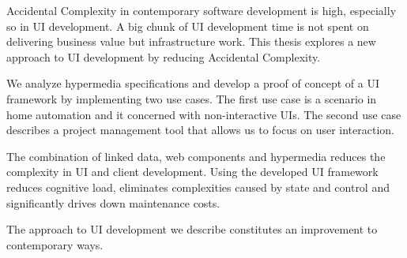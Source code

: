 Accidental Complexity in contemporary software development is high, especially so in UI development. A big chunk of UI development time is not spent on delivering business value but infrastructure work. This thesis explores a new approach to UI development by reducing Accidental Complexity.

We analyze hypermedia specifications and develop a proof of concept of a UI framework by implementing two use cases. The first use case is a scenario in home automation and it concerned with non-interactive UIs. The second use case describes a project management tool that allows us to focus on user interaction.

The combination of linked data, web components and hypermedia reduces the complexity in UI and client development. Using the developed UI framework reduces cognitive load, eliminates complexities caused by state and control and significantly drives down maintenance costs.

The approach to UI development we describe constitutes an improvement to contemporary ways.
